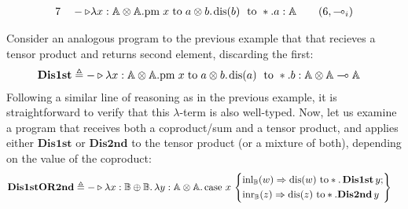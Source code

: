 \begin{example}
\begin{equation*}
\begin{split}
7 \hspace{10 pt} & - \triangleright \lambda x: \mathbb{A \otimes A}. \text{pm} \hspace{3 pt} x \hspace{3 pt} \text{to} \hspace{3 pt} a \otimes b. \hspace{1 pt} \text{dis}(b) \hspace{3 pt} \text{ to } *.a: \mathbb{A} \hspace{10pt} & \text{($6,\multimap_i$)}
\end{split}
\end{equation*}
\end{example}

\begin{example} \label{example:prog_Dis1stor2nd}
  Consider an analogous program to the previous example that that recieves a tensor product and returns
  second element, discarding the first: 
  \begin{equation*}
\begin{split}
& \textbf{Dis1st} \triangleq - \triangleright \lambda x: \mathbb{A \otimes A}. \text{pm} \hspace{3 pt} x \hspace{3 pt} \text{to} \hspace{3 pt} a \otimes b. \hspace{1 pt} \text{dis}(a) \hspace{3 pt} \text{ to } *.b: \mathbb{A \otimes A} \multimap \mathbb{A}
\end{split}
\end{equation*}
Following a similar line of reasoning as in the previous example, it is straightforward to verify that this $\lambda$-term is also well-typed.  
Now, let us examine a program that receives both a coproduct/sum and a tensor product, and applies either $\textbf{Dis1st}$ or $\textbf{Dis2nd}$ to the tensor product (or a mixture of both), depending on the value of the coproduct:
\begin{equation*}
\begin{split}
&  \textbf{Dis1stOR2nd} \triangleq - \triangleright  \lambda x: \mathbb{\mathbb{B} \oplus \mathbb{B}}. \, \lambda y: \mathbb{A \otimes A}. \, 
\text{case } x \,  
  \left\{
    \begin{aligned} 
    &\mathrm{inl}_{\mathbb{B}}(w) \Rightarrow \text{dis}(w) \text{ to} * . \, \textbf{Dis1st} \, y; \\
    &\mathrm{inr}_{\mathbb{B}}(z) \Rightarrow  \text{dis}(z) \text{ to} *. \textbf{Dis2nd} \, y   \\ 
  \end{aligned}  
  \right\}  & \\
\end{split}
\end{equation*}



\end{example}
